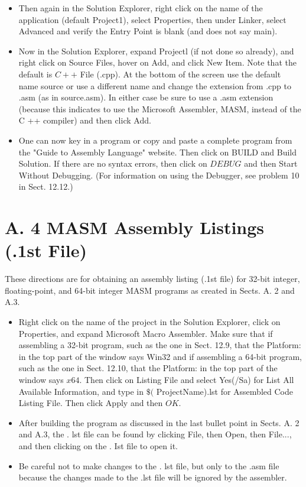 \documentclass[10pt]{article}
\begin{document}
\begin{itemize}
  \item Then again in the Solution Explorer, right click on the name of the application (default Project1), select Properties, then under Linker, select Advanced and verify the Entry Point is blank (and does not say main).
  \item Now in the Solution Explorer, expand Projectl (if not done so already), and right click on Source Files, hover on Add, and click New Item. Note that the default is $C++$ File (.cpp). At the bottom of the screen use the default name source or use a different name and change the extension from .cpp to .asm (as in source.asm). In either case be sure to use a .asm extension (because this indicates to use the Microsoft Assembler, MASM, instead of the C ++ compiler) and then click Add.
  \item One can now key in a program or copy and paste a complete program from the "Guide to Assembly Language" website. Then click on BUILD and Build Solution. If there are no syntax errors, then click on $D E B U G$ and then Start Without Debugging. (For information on using the Debugger, see problem 10 in Sect. 12.12.)
\end{itemize}

\section*{A. 4 MASM Assembly Listings (.1st File)}
These directions are for obtaining an assembly listing (.1st file) for 32-bit integer, floating-point, and 64-bit integer MASM programs as created in Sects. A. 2 and A.3.

\begin{itemize}
  \item Right click on the name of the project in the Solution Explorer, click on Properties, and expand Microsoft Macro Assembler. Make sure that if assembling a 32-bit program, such as the one in Sect. 12.9, that the Platform: in the top part of the window says Win32 and if assembling a 64-bit program, such as the one in Sect. 12.10, that the Platform: in the top part of the window says $x 64$. Then click on Listing File and select Yes(/Sa) for List All Available Information, and type in $\$($ ProjectName).lst for Assembled Code Listing File. Then click Apply and then $O K$.
  \item After building the program as discussed in the last bullet point in Sects. A. 2 and A.3, the . lst file can be found by clicking File, then Open, then File..., and then clicking on the . Ist file to open it.
  \item Be careful not to make changes to the . lst file, but only to the .asm file because the changes made to the .lst file will be ignored by the assembler.
\end{itemize}
\end{document}

